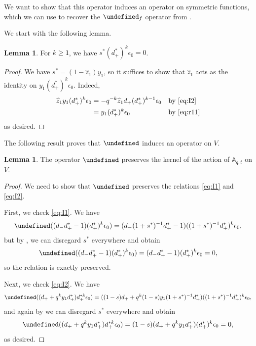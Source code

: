 \documentclass[reqno]{amsart}
\theoremstyle{plain}
\theoremstyle{definition}
\newtheorem{lemma}[theorem]{Lemma}
\theoremstyle{remark}
\newcommand{\A}{\mathbb{A}}%
\newcommand{\z}{\widehat{z}}
\let\oldTheta\Theta
\let\Theta\undefined
\DeclareMathOperator{\Theta}{\oldTheta}
\newcommand{\<}{\langle}
\renewcommand{\>}{\rangle}
\begin{document}
We want to show that this operator induces an operator on symmetric functions, which we can use to recover the $\Theta_f$ operator from \cite[Equation~(28)]{DAdderioIraciVandenWyngaerd2021ThetaOperators}.

We start with the following lemma.

\begin{lemma}
    \label{lem:s*_acts_as_0}
    For $k \geq 1$, we have $s^* (d_+^*)^k \epsilon_0 = 0$.
\end{lemma}

\begin{proof}
    We have $s^* = (1 - \z_1) y_1$, so it suffices to show that $\z_1$ acts as the identity on $y_1 (d_+^*)^k \epsilon_0$. Indeed,
    \begin{align*}
        \z_1 y_1 (d_+^*)^k \epsilon_0 & = -q^{-k} \z_1 d_+ (d_+^*)^{k-1} \epsilon_0 && \text{by \eqref{eq:I2}} \\
        & = y_1 (d_+^*)^k \epsilon_0 && \text{by \eqref{eq:r11}} \\
    \end{align*}
    as desired.
\end{proof}

The following result proves that $\Theta$ induces an operator on $V$.

\begin{lemma}
    \label{lem:preserve_kernel}
    The operator $\Theta$ preserves the kernel of the action of $\A_{q,t}$ on $V$.
\end{lemma}

\begin{proof}
    We need to show that $\Theta$ preserves the relations \eqref{eq:I1} and \eqref{eq:I2}.

    First, we check \eqref{eq:I1}. We have
    \[ \Theta((d_- d_+^* - 1) (d_+^*)^k \epsilon_0) = (d_- (1+s^*)^{-1} d_+^* - 1) ((1+s^*)^{-1} d_+^*)^k \epsilon_0, \]
    but by , we can disregard $s^*$ everywhere and obtain
    \[ \Theta((d_- d_+^* - 1) (d_+^*)^k \epsilon_0) = (d_- d_+^* - 1) (d_+^*)^k \epsilon_0 = 0, \]
    so the relation is exactly preserved.
    
    Next, we check \eqref{eq:I2}. We have
    \[ \Theta((d_+ + q^k y_1 d_+^*) d_+^{*k} \epsilon_0) = ((1-s)d_+ + q^k (1-s) y_1 (1+s^*)^{-1} d_+^*) ((1+s^*)^{-1} d_+^*)^k \epsilon_0, \]
    and again by  we can disregard $s^*$ everywhere and obtain
    \[ \Theta((d_+ + q^k y_1 d_+^*) d_+^{*k} \epsilon_0) = (1-s) (d_+ + q^k y_1 d_+^*) (d_+^*)^k \epsilon_0 = 0, \]
    as desired.
\end{proof}
\end{document}
